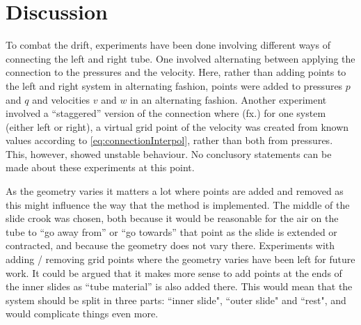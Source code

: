 \section{Discussion}
To combat the drift, experiments have been done involving different ways of connecting the left and right tube. One involved alternating between applying the connection to the pressures and the velocity. Here, rather than adding points to the left and right system in alternating fashion, points were added to pressures $p$ and $q$ and velocities $v$ and $w$ in an alternating fashion. Another experiment involved a ``staggered'' version of the connection where (fx.) for one system (either left or right), a virtual grid point of the velocity was created from known values according to \eqref{eq:connectionInterpol}, rather than both from pressures. This, however, showed unstable behaviour. No conclusory statements can be made about these experiments at this point. 



As the geometry varies it matters a lot where points are added and removed as this might influence the way that the method is implemented.  The middle of the slide crook was chosen, both because it would be reasonable for the air on the tube to ``go away from'' or ``go towards'' that point as the slide is extended or contracted, and because the geometry does not vary there. Experiments with adding / removing grid points where the geometry varies have been left for future work.  It could be argued that it makes more sense to add points at the ends of the inner slides as ``tube material'' is also added there. This would mean that the system should be split in three parts: ``inner slide", ``outer slide" and ``rest", and would complicate things even more.
